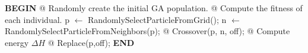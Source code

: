 
\begin{algorithm}
	\caption{SGA - Spin based Genetic AQlgorithm}
	\label{NGalg}
		\begin{algorithmic}


			\STATE \textbf{BEGIN}
  		\STATE @ Randomly create the initial GA population.
  		\STATE @ Compute the fitness of each individual.
  				\STATE p $\leftarrow$ RandomlySelectParticleFromGrid();
  				\STATE n $\leftarrow$ RandomlySelectParticleFromNeighbors(p);
  				\STATE @ Crossover(p, n, off);
  				\STATE @ Compute energy $\Delta H$
  					\STATE @ Replace(p,off);
  				\ENDIF
  			\ENDFOR
  		\ENDFOR
  		\STATE \textbf{END}
\end{algorithmic}
\end{algorithm}